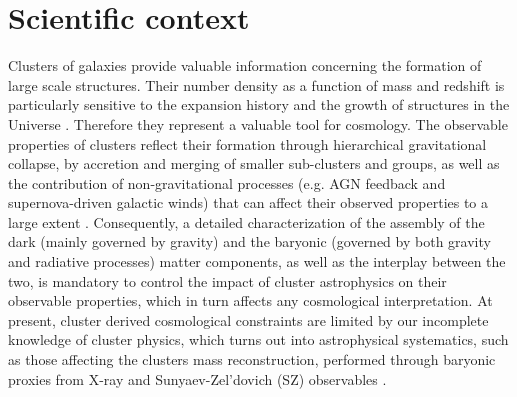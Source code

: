 \documentclass[11pt,a4paper,twoside,graphicx,color]{article}
\begin{document}
\section{Scientific context}
Clusters of galaxies provide valuable information concerning the formation of large scale structures. Their number density as a function of mass and redshift is particularly sensitive to the expansion history and the growth of structures in the Universe \citep[see e.g.]{allen2011}. Therefore they represent a valuable tool for cosmology. The observable properties of clusters reflect their formation through hierarchical gravitational collapse, by accretion and merging of smaller sub-clusters and groups, as well as the contribution of non-gravitational processes (e.g. AGN feedback and supernova-driven galactic winds) that can affect their observed properties to a large extent \citep[e.g.][]{sembolini2014}. Consequently, a detailed characterization of the assembly of the dark (mainly governed by gravity) and the baryonic (governed by both gravity and radiative processes) matter components, as well as the interplay between the two, is mandatory to control the impact of cluster astrophysics on their observable properties, which in turn affects any cosmological interpretation. At present, cluster derived cosmological constraints are limited by our incomplete knowledge of cluster physics, which turns out into astrophysical systematics, such as those affecting the clusters mass reconstruction, performed through baryonic proxies from X-ray and Sunyaev-Zel'dovich (SZ) observables \citep[e.g. ][]{planck_nc_2015}.

\end{document}
